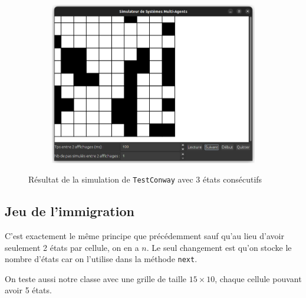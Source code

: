 \documentclass[a4paper, 11pt, french]{article}
\begin{document}
\begin{figure}[H]
\begin{subfigure}{0.3\textwidth}
    \includegraphics[width=\textwidth]{TestConway3.png}
\end{subfigure}
\caption{Résultat de la simulation de \texttt{TestConway} avec 3 états consécutifs}
\end{figure}

\subsection{Jeu de l'immigration}

C'est exactement le même principe que précédemment sauf qu'au lieu d'avoir seulement 2 états par cellule, on en a $n$. Le seul changement est qu'on stocke le nombre d'états car on l'utilise dans la méthode \verb|next|.

On teste aussi notre classe avec une grille de taille $15 \times 10$, chaque cellule pouvant avoir 5 états.
\end{document}
